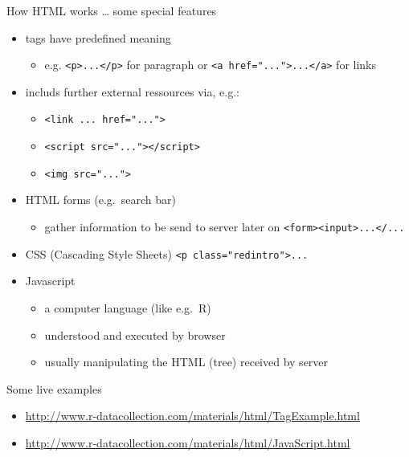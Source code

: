 \documentclass[ignorenonframetext,]{beamer}
\providecommand{\tightlist}{%
  \setlength{\itemsep}{0pt}\setlength{\parskip}{0pt}}
\begin{document}
\begin{frame}[fragile]{How HTML works \ldots{} some special features}

\begin{itemize}
\item
  tags have predefined meaning

  \begin{itemize}
  \tightlist
  \item
    e.g.
    \texttt{\textless{}p\textgreater{}...\textless{}/p\textgreater{}}
    for paragraph or
    \texttt{\textless{}a\ href="..."\textgreater{}...\textless{}/a\textgreater{}}
    for links
  \end{itemize}
\item
  includs further external ressources via, e.g.:

  \begin{itemize}
  \tightlist
  \item
    \texttt{\textless{}link\ ...\ href="..."\textgreater{}}
  \item
    \texttt{\textless{}script\ src="..."\textgreater{}\textless{}/script\textgreater{}}
  \item
    \texttt{\textless{}img\ src="..."\textgreater{}}
  \end{itemize}
\item
  HTML forms (e.g.~search bar)

  \begin{itemize}
  \tightlist
  \item
    gather information to be send to server later on
    \texttt{\textless{}form\textgreater{}\textless{}input\textgreater{}...\textless{}/...}
  \end{itemize}
\item
  CSS (Cascading Style Sheets)
  \texttt{\textless{}p\ class="redintro"\textgreater{}...}
\item
  Javascript

  \begin{itemize}
  \tightlist
  \item
    a computer language (like e.g.~R)
  \item
    understood and executed by browser
  \item
    usually manipulating the HTML (tree) received by server
  \end{itemize}
\end{itemize}

\end{frame}

\begin{frame}{Some live examples}

\begin{itemize}
\tightlist
\item
  \url{http://www.r-datacollection.com/materials/html/TagExample.html}
\item
  \url{http://www.r-datacollection.com/materials/html/JavaScript.html}
\end{itemize}

\end{frame}
\end{document}
